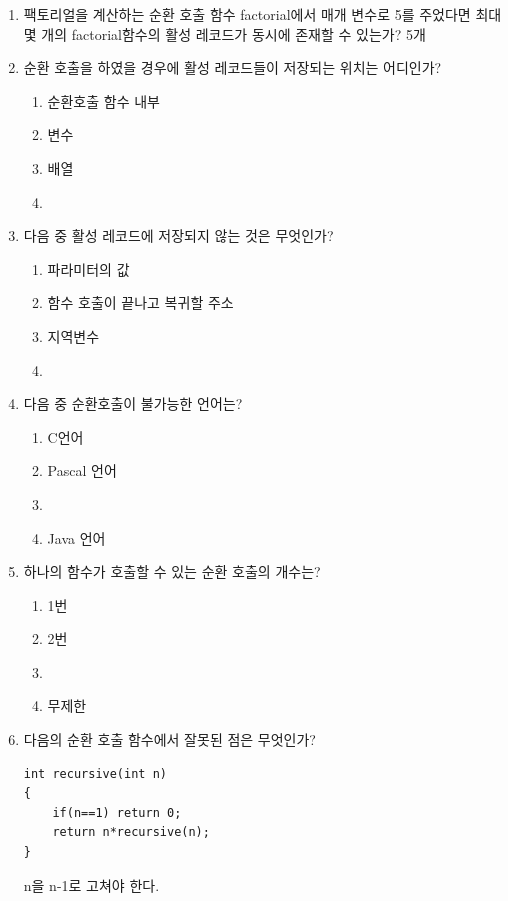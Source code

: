 \documentclass[11pt,a4paper]{article}
\begin{document}
\noindent
\begin{enumerate}
	

\item 팩토리얼을 계산하는 순환 호출 함수 factorial에서 매개 변수로 5를 주었다면 최대 몇 개의 factorial함수의 활성 레코드가 동시에 존재할 수 있는가? 5개

\item 순환 호출을 하였을 경우에 활성 레코드들이 저장되는 위치는 어디인가?
	\begin{enumerate}
	\item 순환호출 함수 내부
	\item 변수
	\item 배열
	\item {}
	\end{enumerate}
	
\item 다음 중 활성 레코드에 저장되지 않는 것은 무엇인가?
	\begin{enumerate}
		\item 파라미터의 값
		\item 함수 호출이 끝나고 복귀할 주소
		\item 지역변수
		\item {}
	\end{enumerate}

\item 다음 중 순환호출이 불가능한 언어는?
	\begin{enumerate}
		\item C언어	
		\item Pascal 언어
		\item {}
		\item Java 언어
	\end{enumerate}

\item 하나의 함수가 호출할 수 있는 순환 호출의 개수는?
	\begin{enumerate}
		\item 1번	
		\item 2번
		\item {}
		\item 무제한
	\end{enumerate}

\item 다음의 순환 호출 함수에서 잘못된 점은 무엇인가?

\lstset{language=C++, tabsize=4, frame=single, showstringspaces=false, breaklines=true, columns=flexible, basicstyle=\ttfamily\small}
\begin{lstlisting}[frame=none]
int recursive(int n)
{
	if(n==1) return 0;
	return n*recursive(n);
}
\end{lstlisting}
n을 n-1로 고쳐야 한다.


\end{enumerate}
\end{document}

